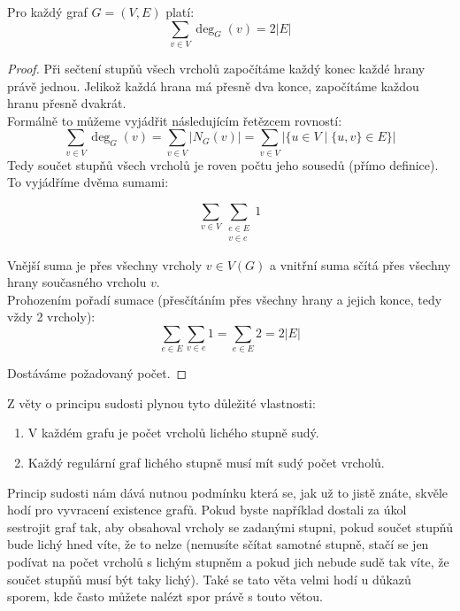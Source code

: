 \begin{theorem}
Pro každý graf $G = (V, E)$ platí:
$$\sum_{v \in V} \deg_G(v) = 2|E|$$
\end{theorem}

\begin{proof}
Při sečtení stupňů všech vrcholů započítáme každý konec každé hrany právě jednou. Jelikož každá hrana má přesně dva konce, započítáme každou hranu přesně dvakrát.\\
Formálně to můžeme vyjádřit následujícím řetězcem rovností:
$$\sum_{v \in V} \deg_G(v) = \sum_{v \in V} |N_G(v)| = \sum_{v \in V} |\{u \in V \mid \{u, v\} \in E\}|$$
Tedy součet stupňů všech vrcholů je roven počtu jeho sousedů (přímo definice). \\

\noindent To vyjádříme dvěma sumami:

$$\sum_{v \in V} \sum_{\substack{e \in E \\ v \in e}} 1$$

\noindent Vnější suma je přes všechny vrcholy $v \in V(G)$ a vnitřní suma sčítá přes všechny hrany současného vrcholu $v$. \\

\noindent Prohozením pořadí sumace (přesčítáním přes všechny hrany a jejich konce, tedy vždy 2 vrcholy):
$$\sum_{e \in E} \sum_{v \in e} 1 = \sum_{e \in E} 2 = 2|E|$$

\noindent Dostáváme požadovaný počet.
  \end{proof}

\bigskip

\begin{corollary}
Z věty o principu sudosti plynou tyto důležité vlastnosti:
\begin{enumerate}
    \item V každém grafu je počet vrcholů lichého stupně sudý.
    \item Každý regulární graf lichého stupně musí mít sudý počet vrcholů.
\end{enumerate}
\end{corollary}

\medskip

\noindent Princip sudosti nám dává nutnou podmínku která se, jak už to jistě znáte, skvěle hodí pro vyvracení existence grafů. Pokud byste například dostali za úkol sestrojit graf tak, aby obsahoval vrcholy se zadanými stupni, pokud součet stupňů bude lichý hned víte, že to nelze (nemusíte sčítat samotné stupně, stačí se jen podívat na počet vrcholů s lichým stupněm a pokud jich nebude sudě tak víte, že součet stupňů musí být taky lichý). Také se tato věta velmi hodí u důkazů sporem, kde často můžete nalézt spor právě s touto větou.

